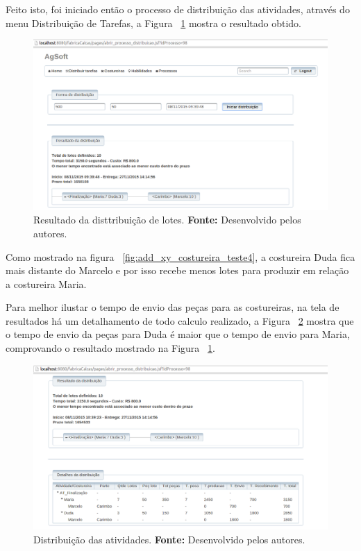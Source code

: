 \par Feito isto, foi iniciado então o processo de distribuição das atividades,
através do menu Distribuição de Tarefas, a Figura
~\ref{fig:resultado_transporte_teste4} mostra o resultado obtido.


\begin{figure}[h!]
	\centerline{\includegraphics[scale=0.3]{./imagens/resultado_transporte_teste4.png}}
	\caption[Resultado da disttribuição de lotes.]
	{Resultado da disttribuição de lotes. \textbf{Fonte:} Desenvolvido pelos
	autores.}
	\label{fig:resultado_transporte_teste4}
\end{figure}

\par Como mostrado na figura ~\ref{fig:add_xy_costureira_teste4}, a costureira
Duda fica mais distante do Marcelo e por isso recebe menos lotes para produzir em
relação a costureira Maria.

\par Para melhor ilustar o tempo de envio das peças para as costureiras, na tela
de resultados há um detalhamento de todo calculo realizado, a Figura
~\ref{fig:detalhameneto_transporte_teste4} mostra que o tempo de envio da peças para Duda é 
maior que o tempo de envio para Maria, comprovando o resultado mostrado na
Figura ~\ref{fig:resultado_transporte_teste4}.

\begin{figure}[h!]
	\centerline{\includegraphics[scale=0.3]{./imagens/detalhamento_transporte_teste4.png}}
	\caption[Distribuição das atividades.] 
	{Distribuição das atividades. \textbf{Fonte:} Desenvolvido pelos autores.}
	\label{fig:detalhameneto_transporte_teste4}
\end{figure}

